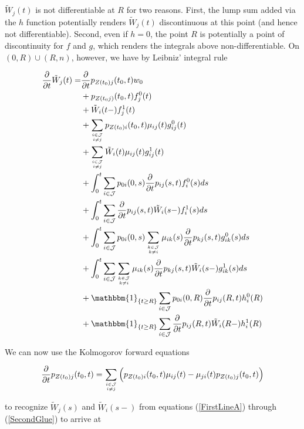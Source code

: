 \documentclass{article}
\newcommand{\1}[1]{\mathbbm{1}_{\left\lbrace #1 \right\rbrace}}
\theoremstyle{break}
\theoremstyle{remark}
\numberwithin{equation}{section}
\begin{document}
\begin{appendices}
$\tilde{W}_j(t)$ is not differentiable at $R$ for two reasons. First, the lump sum added via the $h$ function potentially renders $\tilde{W}_j(t)$ discontinuous at this point (and hence not differentiable). Second, even if $h=0$, the point $R$ is potentially a point of discontinuity for $f$ and $g$, which renders the integrals above non-differentiable. On $(0,R)\cup(R,n)$, however, we have by Leibniz' integral rule

\begin{align*}
\frac{\partial}{\partial t} \tilde{W}_j(t) =& \frac{\partial}{\partial t} p_{Z(t_0)j}(t_0,t) w_0 \\
&+ p_{Z(t_0j)}(t_0,t) f_j^0(t) \\
&+ \tilde{W}_i(t-) f_j^1(t) \\
&+ \sum_{i \in \mathcal{J} \atop i \neq j} p_{Z(t_0)i}(t_0,t) \mu_{ij}(t) g_{ij}^0(t) \\
&+ \sum_{i \in \mathcal{J} \atop i \neq j} \tilde{W}_i(t) \mu_{ij}(t) g_{ij}^1(t) \\
&+ \int_0^t \sum_{i \in \mathcal{J}} p_{0i}(0,s) \frac{\partial}{\partial t} p_{ij}(s,t) f_i^0(s) ds \\
&+ \int_0^t \sum_{i \in \mathcal{J}} \frac{\partial}{\partial t} p_{ij}(s,t) \tilde{W}_i(s-) f_i^1(s) ds \\
&+ \int_0^t \sum_{i \in \mathcal{J}} p_{0i}(0,s) \sum_{k \in \mathcal{J} \atop k \neq i} \mu_{ik}(s) \frac{\partial}{\partial t} p_{kj}(s,t) g_{ik}^0(s) ds \\
&+ \int_0^t \sum_{i \in \mathcal{J}} \sum_{k \in \mathcal{J} \atop k \neq i} \mu_{ik}(s) \frac{\partial}{\partial t} p_{kj}(s,t) \tilde{W}_i(s-) g_{ik}^1(s) ds \\
&+ \1{t \geq R}\sum_{i \in \mathcal{J}} p_{0i}(0,R) \frac{\partial}{\partial t} p_{ij}(R,t) h_i^0(R) \\
&+ \1{t \geq R}\sum_{i \in \mathcal{J}} \frac{\partial}{\partial t} p_{ij}(R,t) \tilde{W}_i(R-) h_i^1(R)
\end{align*}

We can now use the Kolmogorov forward equations

\begin{align*}
\frac{\partial}{\partial t} p_{Z(t_0)j}(t_0,t) = \sum_{i \in \mathcal{J} \atop i \neq j} \left( p_{Z(t_0)i}(t_0,t) \mu_{ij}(t) - \mu_{ji}(t) p_{Z(t_0)j}(t_0,t) \right)
\end{align*}

to recognize $\tilde{W}_j(s)$ and $\tilde{W}_i(s-)$ from equations (\ref{FirstLineA}) through (\ref{SecondGlue}) to arrive at


\end{appendices}
\end{document}
